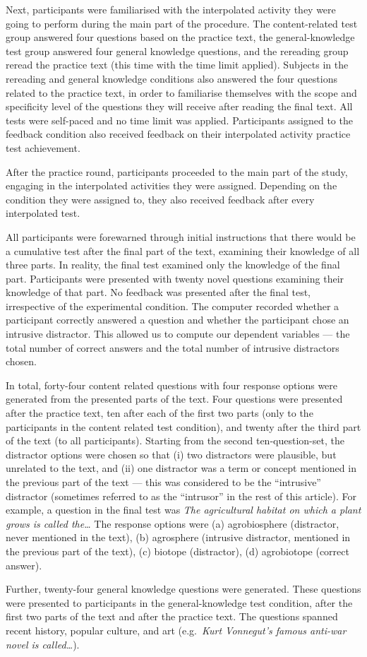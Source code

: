 \documentclass[
  11pt,
]{article}
\begin{document}
Next, participants were familiarised with the interpolated activity they
were going to perform during the main part of the procedure. The
content-related test group answered four questions based on the practice
text, the general-knowledge test group answered four general knowledge
questions, and the rereading group reread the practice text (this time
with the time limit applied). Subjects in the rereading and general
knowledge conditions also answered the four questions related to the
practice text, in order to familiarise themselves with the scope and
specificity level of the questions they will receive after reading the
final text. All tests were self-paced and no time limit was applied.
Participants assigned to the feedback condition also received feedback
on their interpolated activity practice test achievement.

After the practice round, participants proceeded to the main part of the
study, engaging in the interpolated activities they were assigned.
Depending on the condition they were assigned to, they also received
feedback after every interpolated test.

All participants were forewarned through initial instructions that there
would be a cumulative test after the final part of the text, examining
their knowledge of all three parts. In reality, the final test examined
only the knowledge of the final part. Participants were presented with
twenty novel questions examining their knowledge of that part. No
feedback was presented after the final test, irrespective of the
experimental condition. The computer recorded whether a participant
correctly answered a question and whether the participant chose an
intrusive distractor. This allowed us to compute our dependent variables
--- the total number of correct answers and the total number of
intrusive distractors chosen.

In total, forty-four content related questions with four response
options were generated from the presented parts of the text. Four
questions were presented after the practice text, ten after each of the
first two parts (only to the participants in the content related test
condition), and twenty after the third part of the text (to all
participants). Starting from the second ten-question-set, the distractor
options were chosen so that (i) two distractors were plausible, but
unrelated to the text, and (ii) one distractor was a term or concept
mentioned in the previous part of the text --- this was considered to be
the ``intrusive'' distractor (sometimes referred to as the ``intrusor''
in the rest of this article). For example, a question in the final test
was
\textit{The agricultural habitat on which a plant grows is called the\ldots}
The response options were (a) agrobiosphere (distractor, never mentioned
in the text), (b) agrosphere (intrusive distractor, mentioned in the
previous part of the text), (c) biotope (distractor), (d) agrobiotope
(correct answer).

Further, twenty-four general knowledge questions were generated. These
questions were presented to participants in the general-knowledge test
condition, after the first two parts of the text and after the practice
text. The questions spanned recent history, popular culture, and art
(e.g.~\textit{Kurt Vonnegut's famous anti-war novel
is called\ldots}).
\end{document}

